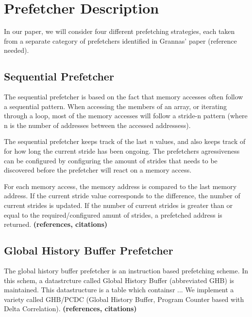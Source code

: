 
\section{Prefetcher Description}
\label{sec:prefetcherDescription}

In our paper, we will consider four different prefetching strategies,
each taken from a separate category of prefetchers identified in
Grannas' paper (reference needed).

\subsection{Sequential Prefetcher}
\label{sec:sequentialPrefetcher}
The sequential prefetcher is based on the fact that memory accesses often follow a sequential pattern. When accessing the members of an array, or iterating through a loop, most of the memory accesses will follow a stride-n pattern (where n is the number of addresses between the accessed addressess). 

The sequential prefetcher keeps track of the last \emph{n} values, and also keeps track of for how long the current stride has been ongoing. The prefetchers agressiveness can be configured by configuring the amount of strides that needs to be discovered before the prefetcher will react on a memory access. 

For each memory access, the memory address is compared to the last memory address. If the current stride value corresponds to the difference, the number of current strides is updated. If the number of current strides is greater than or equal to the required/configured amunt of strides, a prefetched address is returned.
{\bf (references, citations)}

\subsection{Global History Buffer Prefetcher}
\label{sec:ghbPcdcPrefetcher}
The global history buffer prefetcher is an instruction based
prefetching scheme. In this schem, a datastrcture called Global
History Buffer (abbreviated GHB) is maintained. This datastructure is
a table which containsr  ... We implement a variety called GHB/PCDC (Global History
Buffer, Program Counter based with Delta Correlation).  {\bf
  (references, citations)}

